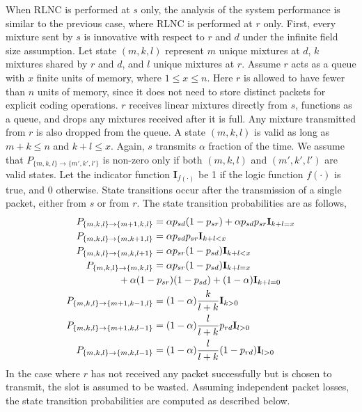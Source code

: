\documentclass[journal, letterpaper]{IEEEtran}
\begin{document}
When RLNC is performed at $s$ only, the analysis of the system performance is similar to the previous case, where RLNC is performed at $r$ only. First, every mixture sent by $s$ is innovative with respect to $r$ and $d$ under the infinite field size assumption. Let state $(m,k,l)$ represent $m$ unique mixtures at $d$, $k$ mixtures shared by $r$ and $d$, and $l$ unique mixtures at $r$. Assume $r$ acts as a queue with $x$ finite units of memory, where $1\leq x\leq n$. Here $r$ is allowed to have fewer than $n$ units of memory, since it does not need to store distinct packets for explicit coding operations. $r$ receives linear mixtures directly from $s$, functions as a queue, and drops any mixtures received after it is full. Any mixture transmitted from $r$ is also dropped from the queue. A state $(m,k,l)$ is valid as long as $m+k\leq n$ and $k+l\leq x$. Again, $s$ transmits $\alpha$ fraction of the time. We assume that $P_{\{m,k,l\}\rightarrow\{m',k',l'\}}$ is non-zero only if both $(m,k,l)$ and $(m',k',l')$ are valid states. Let the indicator function $\mathbf{I}_{f(\cdot)}$ be 1 if the logic function $f(\cdot)$ is true, and 0 otherwise. State transitions occur after the transmission of a single packet, either from $s$ or from $r$. The state transition probabilities are as follows,
\begin{align}
    P_{\{m,k,l\}\rightarrow\{m+1,k,l\}}   &= \alpha p_{sd}(1-p_{sr}) + \alpha p_{sd}p_{sr} \mathbf{I}_{k+l=x} \label{eq:s1}\\
    P_{\{m,k,l\}\rightarrow\{m,k+1,l\}}   &= \alpha p_{sd}p_{sr} \mathbf{I}_{k+l<x} \label{eq:s2}\\
    P_{\{m,k,l\}\rightarrow\{m,k,l+1\}}   &= \alpha p_{sr}(1-p_{sd}) \mathbf{I}_{k+l<x} \label{eq:s3}\\
    P_{\{m,k,l\}\rightarrow\{m,k,l\}}     &= \alpha p_{sr}(1-p_{sd})\mathbf{I}_{k+l=x} \notag \\ & \hspace{-0.5in}+ \alpha (1-p_{sr})(1-p_{sd})+ (1-\alpha)\mathbf{I}_{k+l=0} \label{eq:s4}\\
    P_{\{m,k,l\}\rightarrow\{m+1,k-1,l\}} &= (1-\alpha) \frac{k}{l+k} \mathbf{I}_{k>0} \label{eq:s5}\\
    P_{\{m,k,l\}\rightarrow\{m+1,k,l-1\}} &= (1-\alpha) \frac{l}{l+k} p_{rd}\mathbf{I}_{l>0} \label{eq:s6}\\
    P_{\{m,k,l\}\rightarrow\{m,k,l-1\}}   &= (1-\alpha) \frac{l}{l+k} (1-p_{rd}) \mathbf{I}_{l>0} \label{eq:s7}
\end{align}
In the case where $r$ has not received any packet successfully but is chosen to transmit, the slot is assumed to be wasted. Assuming independent packet losses, the state transition probabilities are computed as described below.
\end{document}
